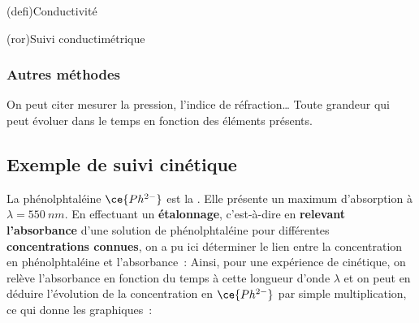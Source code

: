 \documentclass[../../main/main.tex]{subfiles}
\begin{document}
\begin{tcb}(defi){Conductivité}
\end{tcb}

\begin{tcb}[label=prop:conducto, halign=center](ror){Suivi conductimétrique}
\end{tcb}

\subsubsection{Autres méthodes}
On peut citer mesurer la pression, l'indice de réfraction… Toute grandeur qui
peut évoluer dans le temps en fonction des éléments présents.

\subsection{Exemple de suivi cinétique}

La phénolphtaléine $\ce{Ph^{2-}}$ est la . Elle présente
un maximum d'absorption à $\lambda = \SI{550}{nm}$. En effectuant un \textbf{étalonnage},
c'est-à-dire en \textbf{relevant l'absorbance} d'une solution de phénolphtaléine pour
différentes \textbf{concentrations connues}, on a pu ici déterminer le lien
entre la concentration en phénolphtaléine et l'absorbance~:
\psw{
	\[
		[\ce{Ph^{2-}}] = \frac{100}{\num{1.45}}A
		\quad
		\left( \si{\micro mol.L^{-1}} \right)
	\]
}
Ainsi, pour une expérience de cinétique, on relève l'absorbance en
fonction du temps à cette longueur d'onde $\lambda$ et on peut en déduire
l'évolution de la concentration en $\ce{Ph^{2-}}$ par simple multiplication,
ce qui donne les graphiques~:
\end{document}
